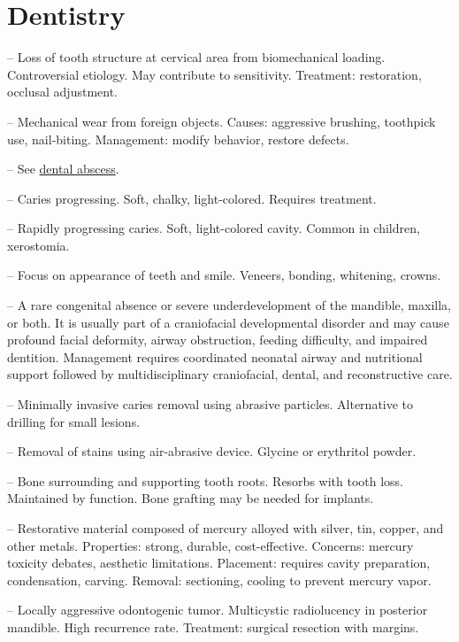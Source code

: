 \chapter{Dentistry}

-- Loss of tooth structure at cervical area from biomechanical loading. Controversial etiology. May contribute to sensitivity. Treatment: restoration, occlusal adjustment.

-- Mechanical wear from foreign objects. Causes: aggressive brushing, toothpick use, nail-biting. Management: modify behavior, restore defects.

-- See \hyperlink{Dental Abscess}{dental abscess}.

-- Caries progressing. Soft, chalky, light-colored. Requires treatment.

-- Rapidly progressing caries. Soft, light-colored cavity. Common in children, xerostomia.

-- Focus on appearance of teeth and smile. Veneers, bonding, whitening, crowns.

-- A rare congenital absence or severe underdevelopment of the mandible, maxilla, or both. It is usually part of a craniofacial developmental disorder and may cause profound facial deformity, airway obstruction, feeding difficulty, and impaired dentition. Management requires coordinated neonatal airway and nutritional support followed by multidisciplinary craniofacial, dental, and reconstructive care.

-- Minimally invasive caries removal using abrasive particles. Alternative to drilling for small lesions.

-- Removal of stains using air-abrasive device. Glycine or erythritol powder.

-- Bone surrounding and supporting tooth roots. Resorbs with tooth loss. Maintained by function. Bone grafting may be needed for implants.

-- Restorative material composed of mercury alloyed with silver, tin, copper, and other metals. Properties: strong, durable, cost-effective. Concerns: mercury toxicity debates, aesthetic limitations. Placement: requires cavity preparation, condensation, carving. Removal: sectioning, cooling to prevent mercury vapor.

-- Locally aggressive odontogenic tumor. Multicystic radiolucency in posterior mandible. High recurrence rate. Treatment: surgical resection with margins.

